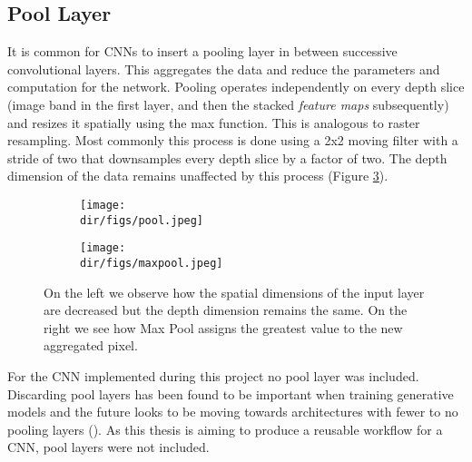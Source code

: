 \subsection{Pool Layer}
It is common for CNNs to insert a pooling layer in between successive convolutional layers. This aggregates the data and reduce the parameters and computation for the network. Pooling operates independently on every depth slice (image band in the first layer, and then the stacked \textit{feature maps} subsequently) and resizes it spatially using the max function. This is analogous to raster resampling. Most commonly this process is done using a 2x2 moving filter with a stride of two that downsamples every depth slice by a factor of two. The depth dimension of the data remains unaffected by this process (Figure \ref{fig.pooling}).
\begin{figure}[H]
\centering
\begin{subfigure}{0.45\textwidth}
\texttt{[image: \\dir/figs/pool.jpeg]}
\caption{}
\label{fig.pool}
\end{subfigure}%
\qquad
\begin{subfigure}{0.45\textwidth}
\texttt{[image: \\dir/figs/maxpool.jpeg]}
\caption{}
\label{fig.maxpool}
\end{subfigure}
\caption[Example of pooling and Max Pool function]{On the left we observe how the spatial dimensions of the input layer are decreased but the depth dimension remains the same. On the right we see how Max Pool assigns the greatest value to the new aggregated pixel.}
\label{fig.pooling}
\end{figure}
\par
For the CNN implemented during this project no pool layer was included. Discarding pool layers has been found to be important when training generative models and the future looks to be moving towards architectures with fewer to no pooling layers (\cite{Springenberg14}). As this thesis is aiming to produce a reusable workflow for a CNN, pool layers were not included. 


